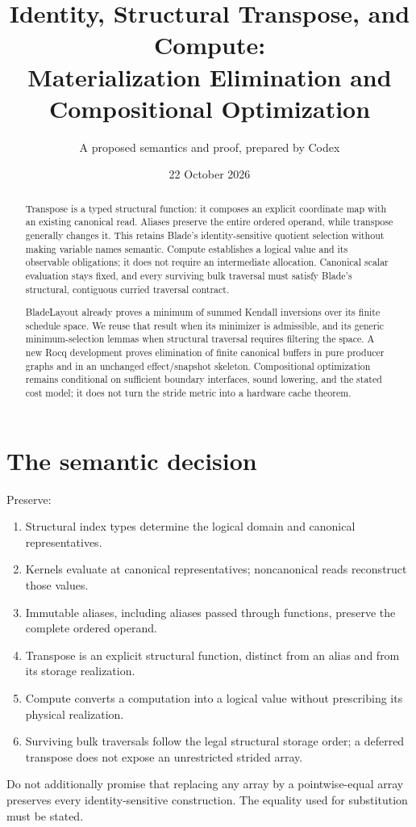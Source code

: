 \documentclass[11pt]{article}
\title{Identity, Structural Transpose, and Compute:\\Materialization Elimination and Compositional Optimization}
\author{A proposed semantics and proof, prepared by Codex}
\date{22 October 2026}
\begin{document}
\maketitle
\begin{abstract}
Transpose is a typed structural function: it composes an explicit coordinate map with an existing canonical read. Aliases preserve the entire ordered operand, while transpose generally changes it. This retains Blade's identity-sensitive quotient selection without making variable names semantic. Compute establishes a logical value and its observable obligations; it does not require an intermediate allocation. Canonical scalar evaluation stays fixed, and every surviving bulk traversal must satisfy Blade's structural, contiguous curried traversal contract.

BladeLayout already proves a minimum of summed Kendall inversions over its finite schedule space. We reuse that result when its minimizer is admissible, and its generic minimum-selection lemmas when structural traversal requires filtering the space. A new Rocq development proves elimination of finite canonical buffers in pure producer graphs and in an unchanged effect/snapshot skeleton. Compositional optimization remains conditional on sufficient boundary interfaces, sound lowering, and the stated cost model; it does not turn the stride metric into a hardware cache theorem.
\end{abstract}

\section{The semantic decision}
Preserve:
\begin{enumerate}
\item Structural index types determine the logical domain and canonical representatives.
\item Kernels evaluate at canonical representatives; noncanonical reads reconstruct those values.
\item Immutable aliases, including aliases passed through functions, preserve the complete ordered operand.
\item Transpose is an explicit structural function, distinct from an alias and from its storage realization.
\item Compute converts a computation into a logical value without prescribing its physical realization.
\item Surviving bulk traversals follow the legal structural storage order; a deferred transpose does not expose an unrestricted strided array.
\end{enumerate}
Do not additionally promise that replacing any array by a pointwise-equal array preserves every identity-sensitive construction. The equality used for substitution must be stated.
\end{document}
